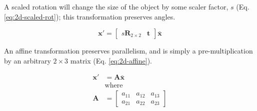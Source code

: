 A scaled rotation will change the size of the object by some scaler factor, $s$ (Eq. \ref{eq:2d-scaled-rot}); this transformation preserves angles.

\begin{equation}
    \mathbf{x}' = \begin{bmatrix}
        s\mathbf{R}_{2 \times 2} & \mathbf{t}
    \end{bmatrix}\bar{\mathbf{x}}
    \label{eq:2d-scaled-rot}
\end{equation}

An affine transformation preserves parallelism, and is simply a pre-multiplication by an arbitrary $2 \times 3$ matrix (Eq. \ref{eq:2d-affine}).

\begin{equation}
    \begin{aligned}
        \mathbf{x}' &= \mathbf{A\bar{x}}\\
        &\text{where}\\
        \mathbf{A} &= \begin{bmatrix}
            a_{11} & a_{12} & a_{13} \\ a_{21} & a_{22} & a_{23}
        \end{bmatrix}
    \end{aligned}
    \label{eq:2d-affine}
\end{equation}
